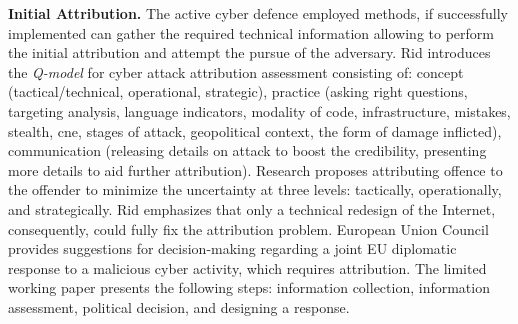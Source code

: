 \textbf{Initial Attribution.}
The active cyber defence employed methods, if successfully implemented can gather the required technical information allowing to perform the initial attribution and attempt the pursue of the adversary.
Rid \cite{Rid2015} introduces the \textit{Q-model} for cyber attack attribution assessment consisting of: concept (tactical/technical, operational, strategic), practice (asking right questions, targeting analysis, language indicators, modality of code, infrastructure, mistakes, stealth, \gls{cne}, stages of attack, geopolitical context, the form of damage inflicted), communication (releasing details on attack to boost the credibility, presenting more details to aid further attribution). Research proposes attributing offence to the offender to minimize the uncertainty at three levels: tactically, operationally, and strategically. Rid emphasizes that only a technical redesign of the Internet, consequently, could fully fix the attribution problem.
European Union Council \cite{EU2018} provides suggestions for decision-making regarding a joint EU diplomatic response to a malicious cyber activity, which requires attribution. The limited working paper presents the following steps: information collection, information assessment, political decision, and designing a response.